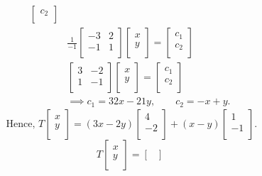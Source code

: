 \documentclass{report}
\begin{document}
{\begin{align*}
\begin{bmatrix}
	  	c_2\\
	  	\end{bmatrix}       \\
		& \frac{1}{-1} \begin{bmatrix}
		-3 & 2\\
		-1 & 1\\
		\end{bmatrix} \begin{bmatrix}
		x\\
		y\\
		\end{bmatrix}
		= \begin{bmatrix}
		c_1\\
		c_2\\
		\end{bmatrix}          \\
		& \begin{bmatrix}
		3 & -2\\
		 1& -1 \\
		\end{bmatrix}   \begin{bmatrix}
		x\\
		y\\
		\end{bmatrix}
		= \begin{bmatrix}
		c_1\\
		c_2\\
		\end{bmatrix}      \\
		& \implies c_1 = 32 x - 21 y, \qquad c_2 = -x + y
	  .\end{align*}
	   \[
	   \text{ Hence, } T \begin{bmatrix}
	   x\\
	   y\\
	   \end{bmatrix}
	   = \left( 3x -2y \right) \begin{bmatrix}
	   4\\
	   -2\\
	   \end{bmatrix}
	   + \left( x-y \right) \begin{bmatrix}
	   1\\
	   -1\\
	   \end{bmatrix}
	   .\] 
	   \[
	   T \begin{bmatrix}
	   x\\
	   y\\
	   \end{bmatrix}
	   = \begin{bmatrix}

\end{bmatrix}\]}
\end{document}
